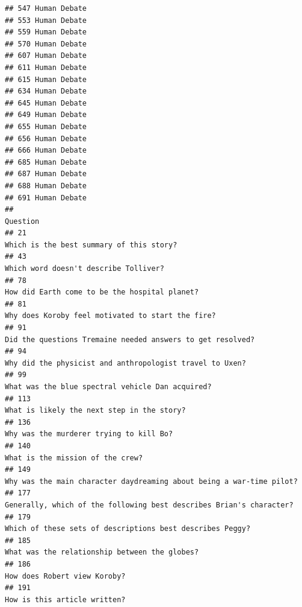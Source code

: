 \documentclass[
]{article}
\begin{document}
\begin{verbatim}
## 547 Human Debate
## 553 Human Debate
## 559 Human Debate
## 570 Human Debate
## 607 Human Debate
## 611 Human Debate
## 615 Human Debate
## 634 Human Debate
## 645 Human Debate
## 649 Human Debate
## 655 Human Debate
## 656 Human Debate
## 666 Human Debate
## 685 Human Debate
## 687 Human Debate
## 688 Human Debate
## 691 Human Debate
##                                                                                                                              Question
## 21                                                                                           Which is the best summary of this story?
## 43                                                                                              Which word doesn't describe Tolliver?
## 78                                                                                      How did Earth come to be the hospital planet?
## 81                                                                                  Why does Koroby feel motivated to start the fire?
## 91                                                                         Did the questions Tremaine needed answers to get resolved?
## 94                                                                           Why did the physicist and anthropologist travel to Uxen?
## 99                                                                                   What was the blue spectral vehicle Dan acquired?
## 113                                                                                        What is likely the next step in the story?
## 136                                                                                           Why was the murderer trying to kill Bo?
## 140                                                                                                  What is the mission of the crew?
## 149                                                              Why was the main character daydreaming about being a war-time pilot?
## 177                                                              Generally, which of the following best describes Brian's character? 
## 179                                                                         Which of these sets of descriptions best describes Peggy?
## 185                                                                                     What was the relationship between the globes?
## 186                                                                                                      How does Robert view Koroby?
## 191                                                                                                      How is this article written?

\end{verbatim}
\end{document}
